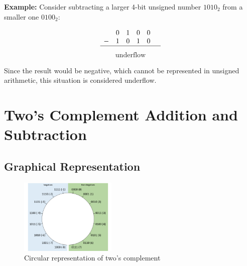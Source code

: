 \documentclass[12pt,openany, tikz,border=10pt]{book}
\begin{document}
\textbf{Example:} Consider subtracting a larger 4-bit unsigned number \(1010_2\) from a smaller one \(0100_2\):

\[
\begin{array}{cccccc}
 & 0 & 1 & 0 & 0 & \\
- & 1 & 0 & 1 & 0 & \\
\hline
\end{array}\]
\vspace{-15px}
\begin{align*}
    \text{underflow}
\end{align*} 

Since the result would be negative, which cannot be represented in unsigned arithmetic, this situation is considered underflow.


\section{Two’s Complement
Addition and Subtraction}
\subsection*{Graphical Representation}

\begin{figure} %
  \centering
  \includegraphics[width=0.41\textwidth]{circle-twoscomplement.png} %
  \caption{Circular representation of two's complement}
\end{figure}
\end{document}
